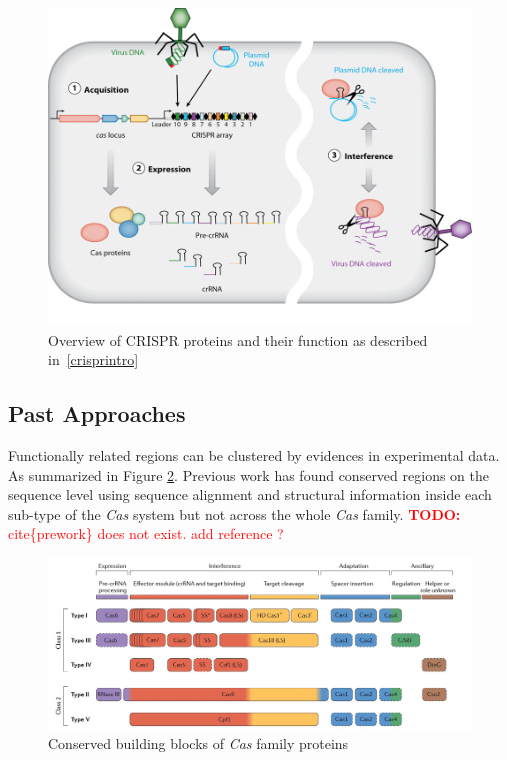 \documentclass[11pt, oneside]{article}
\newcommand{\TODO}[1]{\textcolor{red}{\textbf{TODO: } #1}}
\begin{document}
\begin{figure}[ht]
  \centering
  \includegraphics[scale = 0.4]{images/crisprOverview}
      \caption{Overview of CRISPR proteins and their function as described in~\ref{crisprintro} ~\cite{annualreview}}
      \label{crisprOverview}
\end{figure}

\subsection{Past Approaches}
Functionally related regions can be clustered by evidences in experimental data. As summarized in Figure \ref{buildingBlocks}. Previous work has found conserved regions on the sequence level  using sequence alignment and structural information\cite{preWork} inside each sub-type of the \textit{Cas} system but not across the whole \textit{Cas} family.
\TODO{cite\{prework\} does not exist. add reference ? }

\begin{figure}[ht]
  \centering
  \includegraphics[scale = 0.35]{images/buildingBlocks}
      \caption{Conserved building blocks of \textit{Cas} family proteins}
      \label{buildingBlocks}
\end{figure}
\end{document}

